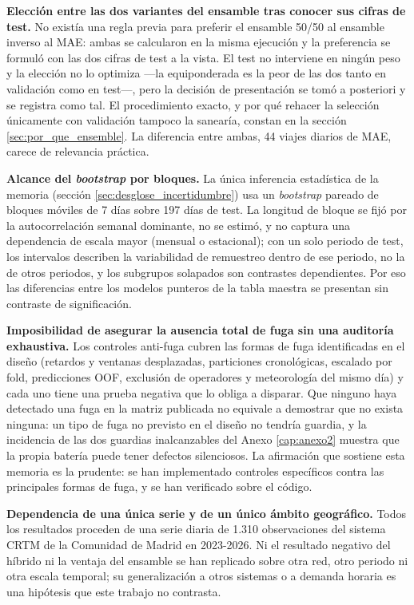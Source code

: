 \textbf{Elección entre las dos variantes del ensamble tras conocer sus cifras de test.}
No existía una regla previa para preferir el ensamble 50/50 al ensamble inverso al MAE:
ambas se calcularon en la misma ejecución y la preferencia se formuló con las dos cifras
de test a la vista. El test no interviene en ningún peso y la elección no lo optimiza —la
equiponderada es la peor de las dos tanto en validación como en test—, pero la decisión
de presentación se tomó a posteriori y se registra como tal. El procedimiento exacto, y
por qué rehacer la selección únicamente con validación tampoco la sanearía, constan en la
sección \ref{sec:por_que_ensemble}. La diferencia entre ambas, 44 viajes diarios de MAE,
carece de relevancia práctica.

\textbf{Alcance del \emph{bootstrap} por bloques.} La única inferencia estadística de la
memoria (sección \ref{sec:desglose_incertidumbre}) usa un \emph{bootstrap} pareado de
bloques móviles de 7 días sobre 197 días de test. La longitud de bloque se fijó por la
autocorrelación semanal dominante, no se estimó, y no captura una dependencia de escala
mayor (mensual o estacional); con un solo periodo de test, los intervalos describen la
variabilidad de remuestreo dentro de ese periodo, no la de otros periodos, y los subgrupos
solapados son contrastes dependientes. Por eso las diferencias entre los modelos punteros
de la tabla maestra se presentan sin contraste de significación.

\textbf{Imposibilidad de asegurar la ausencia total de fuga sin una auditoría
exhaustiva.} Los controles anti-fuga cubren las formas de fuga identificadas en el diseño
(retardos y ventanas desplazadas, particiones cronológicas, escalado por fold,
predicciones OOF, exclusión de operadores y meteorología del mismo día) y cada uno tiene
una prueba negativa que lo obliga a disparar. Que ninguno haya detectado una fuga en la
matriz publicada no equivale a demostrar que no exista ninguna: un tipo de fuga no
previsto en el diseño no tendría guardia, y la incidencia de las dos guardias
inalcanzables del Anexo \ref{cap:anexo2} muestra que la propia batería puede tener
defectos silenciosos. La afirmación que sostiene esta memoria es la prudente: se han
implementado controles específicos contra las principales formas de fuga, y se han
verificado sobre el código.

\textbf{Dependencia de una única serie y de un único ámbito geográfico.} Todos los
resultados proceden de una serie diaria de 1.310 observaciones del sistema CRTM de la
Comunidad de Madrid en 2023-2026. Ni el resultado negativo del híbrido ni la ventaja del
ensamble se han replicado sobre otra red, otro periodo ni otra escala temporal; su
generalización a otros sistemas o a demanda horaria es una hipótesis que este trabajo no
contrasta.

